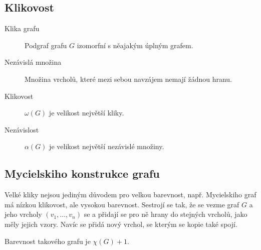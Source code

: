 
\subsection{Klikovost}

\begin{description}
    \item[Klika grafu] Podgraf grafu $G$ izomorfní s něajakým úplným grafem.
    \item[Nezávislá množina] Množina vrcholů, které mezi sebou navzájem nemají žádnou hranu.
    \item[Klikovost] $\omega(G)$ je velikost největší kliky.
    \item[Nezávislost] $\alpha(G)$ je velikost největší nezávislé množiny.
\end{description}


\subsection{Mycielskiho konstrukce grafu}\label{alg:mycielskian}

Velké kliky nejsou jediným důvodem pro velkou barevnost, např. Mycielskiho graf má nízkou klikovost, ale vysokou barevnost.
Sestrojí se tak, že se vezme graf $G$ a jeho vrcholy $(v_1, \dots, v_n)$ se  a přidají se pro ně hrany do stejných vrcholů, jako měly jejich vzory.
Navíc se přidá nový vrchol, se kterým se kopie také spojí.

Barevnost takového grafu je $\chi(G) + 1$. 
